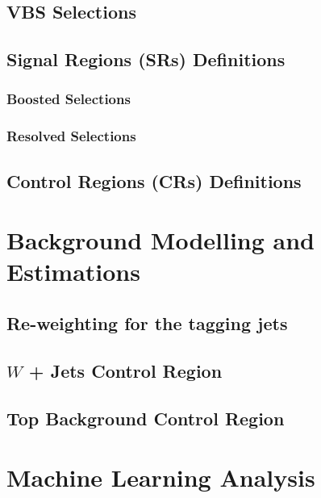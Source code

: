 \documentclass[edeposit,fullpage]{latex/uiucthesis2009}
\begin{document}
\section{VBS Selections}
\section{Signal Regions (SRs) Definitions}
\subsection{Boosted Selections}
\subsection{Resolved Selections}
\section{Control Regions (CRs) Definitions}

\chapter{Background Modelling and Estimations}
\section{Re-weighting for the tagging jets}
\section{\( W \) + Jets Control Region}
\section{Top Background Control Region}

\chapter{Machine Learning Analysis}
\end{document}
